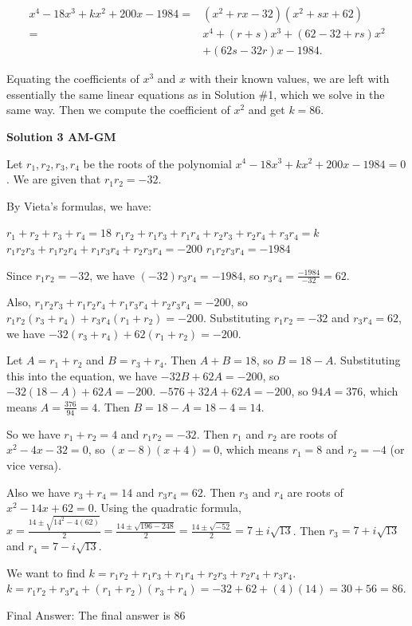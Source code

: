 \begin{enumerate}
 
 \begin{align*}x^4-18x^3+kx^2+200x-1984 =& (x^2+rx-32)(x^2+sx+62)\\  =& x^4+(r+s)x^3+(62-32+rs)x^2\\ &+(62s-32r)x-1984.\end{align*}


 Equating the coefficients of $x^3$ and $x$ with their known values, we are left with essentially the same linear equations as in Solution \#1, which we solve in the same way. Then we compute the coefficient of $x^2$ and get $k=\boxed{86}.$




\textbf{Solution 3 AM-GM}

Let $r_1, r_2, r_3, r_4$ be the roots of the polynomial $x^4 - 18x^3 + kx^2 + 200x - 1984 = 0$. We are given that $r_1 r_2 = -32$.

 By Vieta's formulas, we have:

 $r_1+r_2+r_3+r_4 = 18$
$r_1r_2+r_1r_3+r_1r_4+r_2r_3+r_2r_4+r_3r_4 = k$
$r_1r_2r_3+r_1r_2r_4+r_1r_3r_4+r_2r_3r_4 = -200$
$r_1r_2r_3r_4 = -1984$

 Since $r_1r_2 = -32$, we have $(-32)r_3r_4 = -1984$, so $r_3r_4 = \frac{-1984}{-32} = 62$.

 Also, $r_1r_2r_3+r_1r_2r_4+r_1r_3r_4+r_2r_3r_4 = -200$, so $r_1r_2(r_3+r_4)+r_3r_4(r_1+r_2) = -200$. Substituting $r_1r_2 = -32$ and $r_3r_4 = 62$, we have $-32(r_3+r_4)+62(r_1+r_2) = -200$.

 Let $A = r_1+r_2$ and $B = r_3+r_4$. Then $A+B = 18$, so $B = 18-A$. Substituting this into the equation, we have $-32B+62A = -200$, so $-32(18-A)+62A = -200$. $-576+32A+62A = -200$, so $94A = 376$, which means $A = \frac{376}{94} = 4$. Then $B = 18-A = 18-4 = 14$.

 So we have $r_1+r_2 = 4$ and $r_1r_2 = -32$. Then $r_1$ and $r_2$ are roots of $x^2-4x-32 = 0$, so $(x-8)(x+4) = 0$, which means $r_1 = 8$ and $r_2 = -4$ (or vice versa).

 Also we have $r_3+r_4 = 14$ and $r_3r_4 = 62$. Then $r_3$ and $r_4$ are roots of $x^2-14x+62 = 0$. Using the quadratic formula, $x = \frac{14 \pm \sqrt{14^2-4(62)}}{2} = \frac{14 \pm \sqrt{196-248}}{2} = \frac{14 \pm \sqrt{-52}}{2} = 7 \pm i\sqrt{13}$. Then $r_3 = 7+i\sqrt{13}$ and $r_4 = 7-i\sqrt{13}$.

 We want to find $k = r_1r_2+r_1r_3+r_1r_4+r_2r_3+r_2r_4+r_3r_4$. $k = r_1r_2+r_3r_4 + (r_1+r_2)(r_3+r_4) = -32+62+(4)(14) = 30+56 = 86$.

 Final Answer: The final answer is $\boxed{86}$





\end{enumerate}
